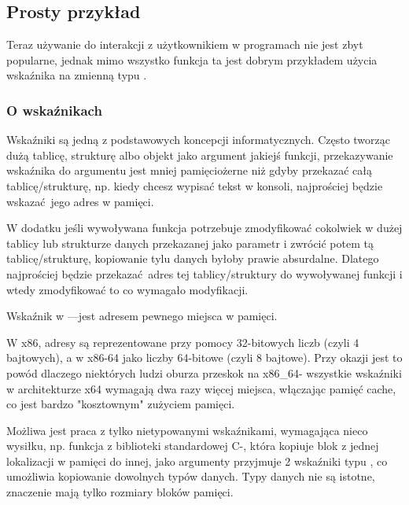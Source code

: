 \subsection{Prosty przykład}



Teraz używanie \scanf do interakcji z użytkownikiem w programach nie jest zbyt popularne, jednak mimo wszystko funkcja ta jest dobrym przykładem użycia wskaźnika na zmienną typu  \Tint.

\subsubsection{O wskaźnikach}
\myindex{\CLanguageElements!\Pointers}

Wskaźniki są jedną z podstawowych koncepcji informatycznych. Często tworząc dużą tablicę, strukturę albo objekt jako argument jakiejś funkcji, przekazywanie wskaźnika do argumentu jest mniej pamięciożerne niż gdyby przekazać całą tablicę/strukturę, np. kiedy chcesz wypisać tekst w konsoli, najprościej będzie wskazać jego adres w pamięci.

W dodatku jeśli wywoływana funkcja potrzebuje zmodyfikować cokolwiek w dużej tablicy lub strukturze danych przekazanej jako parametr i zwrócić potem tą tablicę/strukturę, kopiowanie tylu danych byłoby prawie absurdalne. Dlatego najprościej będzie przekazać adres tej tablicy/struktury do wywoływanej funkcji i wtedy zmodyfikować to co wymagało modyfikacji.

Wskaźnik w \CCpp---jest adresem pewnego miejsca w pamięci.

W x86, adresy są reprezentowane przy pomocy 32-bitowych liczb (czyli 4 bajtowych), a w x86-64 jako liczby 64-bitowe (czyli 8 bajtowe). Przy okazji jest to powód dlaczego niektórych ludzi oburza przeskok na x86_64- wszystkie wskaźniki w architekturze x64 wymagają dwa razy więcej miejsca, włączając pamięć cache, co jest bardzo "kosztownym" zużyciem pamięci.

Możliwa jest praca z tylko nietypowanymi wskaźnikami, wymagająca nieco wysiłku, np. funkcja z biblioteki standardowej C-, która kopiuje blok z jednej lokalizacji w pamięci do innej, jako argumenty przyjmuje 2 wskaźniki typu , co umożliwia kopiowanie dowolnych typów danych. Typy danych nie są istotne, znaczenie mają tylko rozmiary bloków pamięci.

